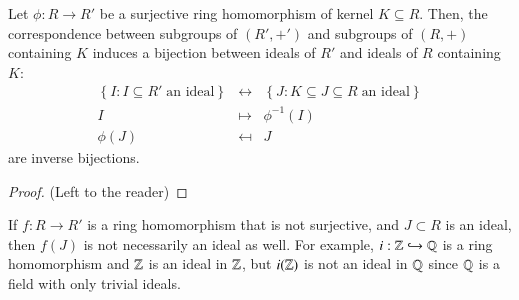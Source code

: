 \begin{theorem}\label{thmname:corrring}
    Let $\phi:R \rightarrow R'$ be a surjective ring homomorphism of kernel $K \subseteq R$. Then, the correspondence between subgroups of $(R',+')$ and subgroups of $(R,+)$ containing $K$ induces a bijection between ideals of $R'$ and ideals of $R$ containing $K$: 
    \begin{equation}
        \begin{array}{rcl}
            \left\{I:I\subseteq R'\;\text{an ideal}\right\} &\leftrightarrow& \left\{J:K \subseteq J \subseteq R\;\text{an ideal}\right\} \\
            I &\mapsto& \phi^{-1}(I) \\
            \phi(J) &\mapsfrom& J
        \end{array}
    \end{equation}
    are inverse bijections.
\end{theorem}
\begin{proof}
    (Left to the reader)
\end{proof}

\begin{remark}
        If $f:R\rightarrow R'$ is a ring homomorphism that is not surjective, and $J \subset R$ is an ideal, then $f(J)$ is not necessarily an ideal as well. For example, $i:\mathbb Z\hookrightarrow \mathbb Q$ is a ring homomorphism and $\mathbb Z$ is an ideal in $\mathbb Z$, but $i(\mathbb Z)$ is not an ideal in $\mathbb Q$ since $\mathbb Q$ is a field with only trivial ideals.
\end{remark}
